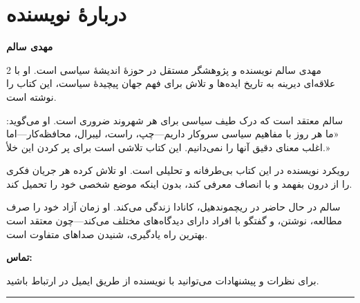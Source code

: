 \chapter*{دربارهٔ نویسنده}

\begin{center}
\textbf{\Large مهدی سالم}
\end{center}

\vspace{10mm}

\begin{multicols}{2}
مهدی سالم نویسنده و پژوهشگر مستقل در حوزهٔ اندیشهٔ سیاسی است. او با علاقه‌ای دیرینه به تاریخ ایده‌ها و تلاش برای فهم جهان پیچیدهٔ سیاست، این کتاب را نوشته است.

سالم معتقد است که درک طیف سیاسی برای هر شهروند ضروری است. او می‌گوید: «ما هر روز با مفاهیم سیاسی سروکار داریم—چپ، راست، لیبرال، محافظه‌کار—اما اغلب معنای دقیق آنها را نمی‌دانیم. این کتاب تلاشی است برای پر کردن این خلأ.»

رویکرد نویسنده در این کتاب بی‌طرفانه و تحلیلی است. او تلاش کرده هر جریان فکری را از درون بفهمد و با انصاف معرفی کند، بدون اینکه موضع شخصی خود را تحمیل کند.



سالم در حال حاضر در ریچموندهیل، کانادا زندگی می‌کند. او زمان آزاد خود را صرف مطالعه، نوشتن، و گفتگو با افراد دارای دیدگاه‌های مختلف می‌کند—چون معتقد است بهترین راه یادگیری، شنیدن صداهای متفاوت است.

\vspace{5mm}

\textbf{تماس:}

برای نظرات و پیشنهادات می‌توانید با نویسنده از طریق ایمیل در ارتباط باشید.

\end{multicols}

\vspace{20mm}

\begin{center}
\rule{0.5\textwidth}{1pt}
\end{center}

\newpage
\thispagestyle{empty}

\vspace*{\fill}

